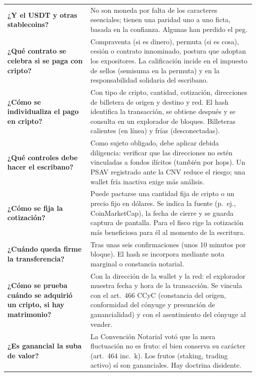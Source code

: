 \documentclass[12pt,oneside,a4paper]{book}
\begin{document}
\begin{longtable}{@{}>{\RaggedRight\arraybackslash}p{}>{\RaggedRight\arraybackslash}p{}@{}}
\addlinespace
\cmidrule{1-2}
\textbf{¿Y el USDT y otras stablecoins?} &
No son moneda por falta de los caracteres esenciales; tienen una paridad uno a uno ficta, basada en la confianza. Algunas han perdido el peg. \\
\addlinespace
\cmidrule{1-2}
\textbf{¿Qué contrato se celebra si se paga con cripto?} &
Compraventa (si es dinero), permuta (si es cosa), cesión o contrato innominado, postura que adoptan los expositores. La calificación incide en el impuesto de sellos (semisuma en la permuta) y en la responsabilidad solidaria del escribano. \\
\addlinespace
\cmidrule{1-2}
\textbf{¿Cómo se individualiza el pago en cripto?} &
Con tipo de cripto, cantidad, cotización, direcciones de billetera de origen y destino y red. El hash identifica la transacción, se obtiene después y se consulta en un explorador de bloques. Billeteras calientes (en línea) y frías (desconectadas). \\
\addlinespace
\cmidrule{1-2}
\textbf{¿Qué controles debe hacer el escribano?} &
Como sujeto obligado, debe aplicar debida diligencia: verificar que las direcciones no estén vinculadas a fondos ilícitos (también por hops). Un PSAV registrado ante la CNV reduce el riesgo; una wallet fría inactiva exige más análisis. \\
\addlinespace
\cmidrule{1-2}
\textbf{¿Cómo se fija la cotización?} &
Puede pactarse una cantidad fija de cripto o un precio fijo en dólares. Se indica la fuente (p.~ej., CoinMarketCap), la fecha de cierre y se guarda captura de pantalla. Para el fisco rige la cotización más beneficiosa para él al momento de la escritura. \\
\addlinespace
\cmidrule{1-2}
\textbf{¿Cuándo queda firme la transferencia?} &
Tras unas seis confirmaciones (unos 10 minutos por bloque). El hash se incorpora mediante nota marginal o constancia notarial. \\
\addlinespace
\cmidrule{1-2}
\textbf{¿Cómo se prueba cuándo se adquirió un cripto, si hay matrimonio?} &
Con la dirección de la wallet y la red: el explorador muestra fecha y hora de la transacción. Se vincula con el art.~466 CCyC (constancia del origen, conformidad del cónyuge y presunción de ganancialidad) y con el asentimiento del cónyuge al vender. \\
\addlinespace
\cmidrule{1-2}
\textbf{¿Es ganancial la suba de valor?} &
La Convención Notarial votó que la mera fluctuación no es fruto: el bien conserva su carácter (art.~464 inc.~k). Los frutos (staking, trading activo) sí son gananciales. Hay doctrina disidente. \\

\end{longtable}
\end{document}
